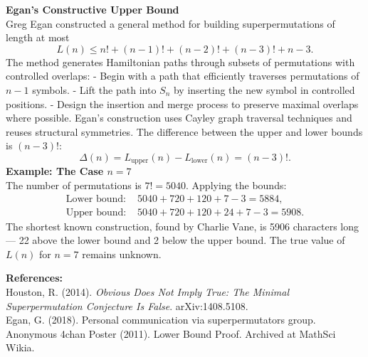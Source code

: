 \begin{technical}
\noindent\textbf{Egan's Constructive Upper Bound}\\
Greg Egan constructed a general method for building superpermutations of length at most
\[
L(n) \leq n! + (n-1)! + (n-2)! + (n-3)! + n - 3.
\]
The method generates Hamiltonian paths through subsets of permutations with controlled overlaps:
- Begin with a path that efficiently traverses permutations of $n-1$ symbols.
- Lift the path into $S_n$ by inserting the new symbol in controlled positions.
- Design the insertion and merge process to preserve maximal overlaps where possible.
Egan's construction uses Cayley graph traversal techniques and reuses structural symmetries. The difference between the upper and lower bounds is $(n-3)!$:
\[
\Delta(n) = L_{\text{upper}}(n) - L_{\text{lower}}(n) = (n-3)!.
\]
\noindent\textbf{Example: The Case $n = 7$}\\
The number of permutations is $7! = 5040$. Applying the bounds:
\begin{align}
\text{Lower bound: } & 5040 + 720 + 120 + 7 - 3 = 5884, \\
\text{Upper bound: } & 5040 + 720 + 120 + 24 + 7 - 3 = 5908.
\end{align}
The shortest known construction, found by Charlie Vane, is 5906 characters long — 22 above the lower bound and 2 below the upper bound. The true value of $L(n)$ for $n = 7$ remains unknown.

\noindent\textbf{References:}\\
Houston, R. (2014). \textit{Obvious Does Not Imply True: The Minimal Superpermutation Conjecture Is False}. arXiv:1408.5108.\\
Egan, G. (2018). Personal communication via superpermutators group.\\
Anonymous 4chan Poster (2011). Lower Bound Proof. Archived at MathSci Wikia.
\end{technical}
